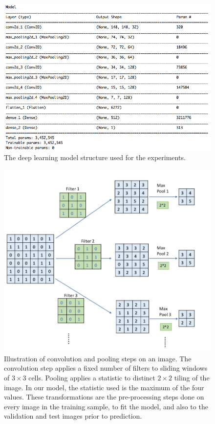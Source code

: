 \documentclass[12pt]{article}
\begin{document}
\begin{figure}[h]
\centerline{\includegraphics[width=15cm]{figures/modelstruc.png}}
\caption{The deep learning model structure used for the experiments.}
\label{modelstruc}
\end{figure}

\begin{figure}[h]
\centerline{\includegraphics[width=15cm]{figures/diagconv.png}}
\caption{Illustration of convolution and pooling steps on an image. The convolution step applies a fixed number of filters to sliding windows of $3\times 3$ cells. Pooling applies a statistic to distinct $2\times 2$ tiling of the image. In our model, the statistic used is the maximum of the four values. These transformations are the pre-processing steps done on every image in the training sample, to fit the model, and also to the validation and test images prior to prediction. }
\label{diagconv}
\end{figure}
\end{document}
